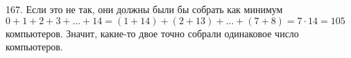 167. Если это не так, они должны были бы собрать как минимум $0+1+2+3+\ldots+14=(1+14)+(2+13)+\ldots+(7+8)=7\cdot14=105$ компьютеров. Значит, какие-то двое точно собрали одинаковое число компьютеров.\\
